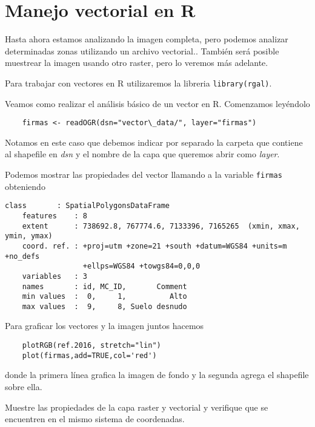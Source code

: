 \section{Manejo vectorial en R}

Hasta ahora estamos analizando la imagen completa, pero podemos analizar
determinadas zonas utilizando un archivo vectorial.. Tambi\'en ser\'a
posible muestrear la imagen usando otro raster, pero lo veremos m\'as adelante.

Para trabajar con vectores en R utilizaremos la libreria
\texttt{library(rgal)}.

\begin{exa}
    Veamos como realizar el an\'alisis b\'asico de un vector en R. Comenzamos
    ley\'endolo

    \begin{lstlisting}
    firmas <- readOGR(dsn="vector\_data/", layer="firmas")
    \end{lstlisting}

    Notamos en este caso que debemos indicar por separado la carpeta que
    contiene al shapefile en \emph{dsn} y el nombre de la capa que queremos
    abrir como \emph{layer}.

    Podemos mostrar las propiedades del vector llamando a la variable
    \texttt{firmas} obteniendo
    \begin{Verbatim}[fontsize=\small]
    class       : SpatialPolygonsDataFrame
    features    : 8
    extent      : 738692.8, 767774.6, 7133396, 7165265  (xmin, xmax, ymin, ymax)
    coord. ref. : +proj=utm +zone=21 +south +datum=WGS84 +units=m +no_defs
                  +ellps=WGS84 +towgs84=0,0,0
    variables   : 3
    names       : id, MC_ID,       Comment
    min values  :  0,     1,          Alto
    max values  :  9,     8, Suelo desnudo
    \end{Verbatim}

    Para graficar los vectores y la imagen juntos hacemos

    \begin{lstlisting}
    plotRGB(ref.2016, stretch="lin")
    plot(firmas,add=TRUE,col='red')
    \end{lstlisting}
    donde la primera l\'inea grafica la imagen de fondo y la segunda agrega el
    shapefile sobre ella.
\end{exa}

\begin{act}
    Muestre las propiedades de la capa raster y vectorial y verifique
    que se encuentren en el mismo sistema de coordenadas.
\end{act}


